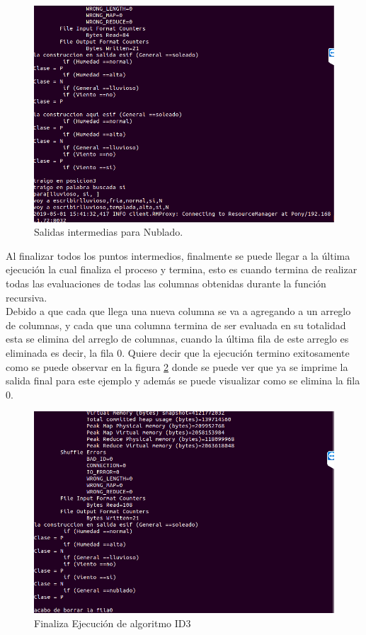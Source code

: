 \begin{figure}[H]
	\begin{center}
		\hypertarget{fig:ID310}{\hspace{1pt}}
		\includegraphics[width=.7\textwidth]{capitulo4a/images/ID3_12.png}
		\caption{Salidas intermedias para Nublado.}
		\label{fig:ID310}
	\end{center}
\end{figure}
Al finalizar todos los puntos intermedios, finalmente se puede llegar a la última ejecución la cual finaliza el proceso y termina, esto es cuando termina de realizar todas las evaluaciones de todas las columnas obtenidas durante la función recursiva. 
\\
Debido a que cada que llega una nueva columna se va a agregando a un arreglo de columnas, y cada que una columna termina de ser evaluada en su totalidad esta se elimina del arreglo de columnas, cuando la última fila de este arreglo es eliminada es decir, la fila 0. 
Quiere decir que la ejecución termino exitosamente como se puede observar en la figura \ref{fig:ID311} donde se puede ver que ya se imprime la salida final para este ejemplo y además se puede visualizar como se elimina la fila 0.
\begin{figure}[H]
	\begin{center}
		\hypertarget{fig:ID310}{\hspace{1pt}}
		\includegraphics[width=.7\textwidth]{capitulo4a/images/ID3_15.png}
		\caption{Finaliza Ejecución de algoritmo ID3}
		\label{fig:ID311}
	\end{center}
\end{figure}
